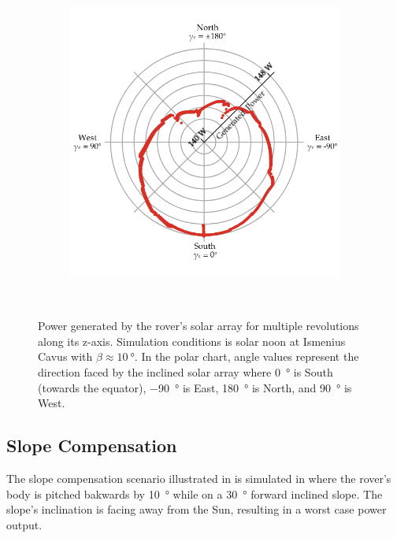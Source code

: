 \begin{figure}[h]
\begin{subfigure}[t]{\subfigureWidth}
        \includegraphics[height=\graphicsHeight]{sections/design/simulation/plots/zaxis-revolutions-polar.png}
		\label{fig:sub:simulation-data-rover-revolution-generated-power-polar-chart}
	\end{subfigure}\\[0.6ex]
    \caption[Power generated by the rover's solar array for multiple revolutions along its z-axis]
            {Power generated by the rover's solar array for multiple revolutions along its z-axis. Simulation conditions is solar noon at Ismenius Cavus with $\beta \approx \SI{10}{\degree}$. In the polar chart, angle values represent the direction faced by the inclined solar array where \SI{0}{\degree} is South (towards the equator), \SI{-90}{\degree} is East, \SI{180}{\degree} is North, and \SI{90}{\degree} is West.}
    \label{fig:simulation-data-rover-revolution-generated-power}
\vspace{-2ex}
\end{figure}


\subsection{Slope Compensation}

The slope compensation scenario illustrated in  is simulated in  where the rover's body is pitched bakwards by \SI{10}{\degree} while on a \SI{30}{\degree} forward inclined slope. The slope's inclination is facing away from the Sun, resulting in a worst case power output.

